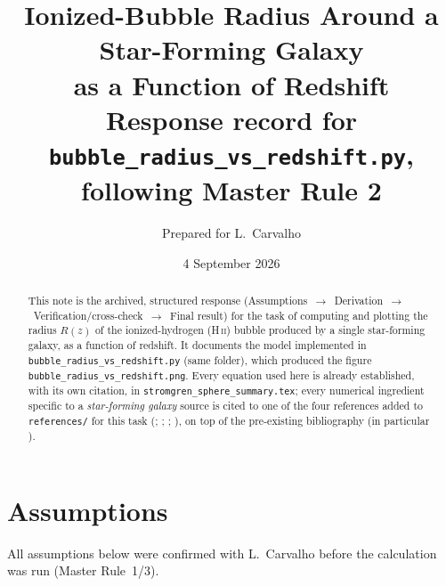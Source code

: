 \documentclass[11pt,a4paper]{article}
\title{\bf Ionized-Bubble Radius Around a Star-Forming Galaxy\\ as a Function of Redshift\\[2mm]
\large Response record for \texttt{bubble\_radius\_vs\_redshift.py}, following Master Rule 2}
\author{Prepared for L.\ Carvalho}
\date{4 September 2026}
\newcommand{\HII}{\ion{H}{ii}}
\newcommand{\ion}[2]{\textrm{#1\,\textsc{#2}}}
\begin{document}
\maketitle

\begin{abstract}
\noindent
This note is the archived, structured response (Assumptions~$\to$~Derivation~$\to$~Verification/cross-check~$\to$~Final
result) for the task of computing and plotting the radius $R(z)$ of the ionized-hydrogen (\HII) bubble
produced by a single star-forming galaxy, as a function of redshift. It documents the model implemented in
\texttt{bubble\_radius\_vs\_redshift.py} (same folder), which produced the figure
\texttt{bubble\_radius\_vs\_redshift.png}. Every equation used here is already established, with its own
citation, in \texttt{stromgren\_sphere\_summary.tex}; every numerical ingredient specific to a
\emph{star-forming galaxy} source is cited to one of the four references added to \texttt{references/} for
this task (\citealt{Llerena2024}; \citealt{Robertson2015}; \citealt{MadauDickinson2014};
\citealt{Planck2018VI}), on top of the pre-existing bibliography (in particular
\citealt{Cen2000,Mesinger2004,Kitayama2004,Umeda2023,White2003}).
\end{abstract}

\tableofcontents

\section{Assumptions}
\label{sec:assumptions}

All assumptions below were confirmed with L.\ Carvalho before the calculation was run (Master Rule~1/3).
\end{document}
